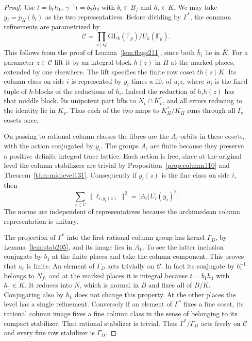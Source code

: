 \documentclass[a4paper,11pt]{article}
\theoremstyle{definition}
\theoremstyle{remark}
\numberwithin{equation}{section}
\begin{document}
\begin{proof}
Use \(t=b_1h_1,\ \gamma^{-1}t=b_2h_2\) with \(b_i\in B_f\)
and \(h_i\in K\). We may take \(y_i=p_H(b_i)\) as the two
representatives. Before dividing by \(\Gamma^*\), the common
refinements are parametrized by
\[
             \mathcal C=\prod_{v\mid Q}
                 \mathrm{GL}_k(\mathbb F_g)/U_k(\mathbb F_g).
\]
This follows from the proof of Lemma~\ref{lem:flags211}, since
both \(\bar h_i\) lie in \(\bar K\). For a parameter \(z\in\mathcal C\)
lift it by an integral block \(h(z)\) in \(H\) at the marked
places, extended by one elsewhere. The lift specifies the finite
row coset \(th(z)K\). Its column class on side \(i\) is represented
by \(y_i\) times a lift of \(u_i z\), where \(u_i\) is the fixed
tuple of \(k\)-blocks of the reductions of \(h_i\). Indeed the
reduction of \(h_i h(z)\) has that middle block. Its unipotent
part lifts to \(N_v\cap K_v^*\), and all errors reducing to the
identity lie in \(K_v\). Thus each of the two maps to
\(K_H^*/K_H\) runs through all \(I_\pi\) cosets once.

On passing to rational column classes the fibres are the
\(A_i\)-orbits in these cosets, with the action conjugated by
\(y_i\). The groups \(A_i\) are finite because they preserve a
positive definite integral trace lattice. Each action is free,
since at the original level the column stabilizers are trivial
by Proposition~\ref{prop:column110} and
Theorem~\ref{thm:midlevel131}. Consequently if \(y_i(z)\) is
the fine class on side \(i\), then
\[
              \sum_{z\in\mathcal C}\|\ell_{i,y_i(z)}\|^2
                         =|A_i|\,U_i(y_i)^2 .
\]
The norms are independent of representatives because the
archimedean column representation is unitary.

The projection of \(\Gamma^*\) into the first rational column
group has kernel \(\Gamma_D\), by Lemma~\ref{lem:stab205}, and
its image lies in \(A_1\). To see the latter inclusion conjugate
by \(b_1\) at the finite places and take the column component.
This proves that \(a_t\) is finite. An element of \(\Gamma_D\)
acts trivially on \(\mathcal C\). In fact its conjugate by
\(b_1^{-1}\) belongs to \(N_f\), and at the marked places
it is integral because \(t=b_1h_1\) with \(h_1\in K\).
It reduces into \(\bar N\), which is normal in \(\bar B\)
and fixes all of \(\bar B/\bar K\). Conjugating also by \(h_1\)
does not change this property. At the other places the level
has a single refinement. Conversely if an element of \(\Gamma^*\)
fixes a fine coset, its rational column image fixes a fine
column class in the sense of belonging to its compact stabilizer.
That rational stabilizer is trivial. Thus
\(\Gamma^*/\Gamma_D\) acts freely on \(\mathcal C\) and every
fine row stabilizer is \(\Gamma_D\).


\end{proof}
\end{document}
